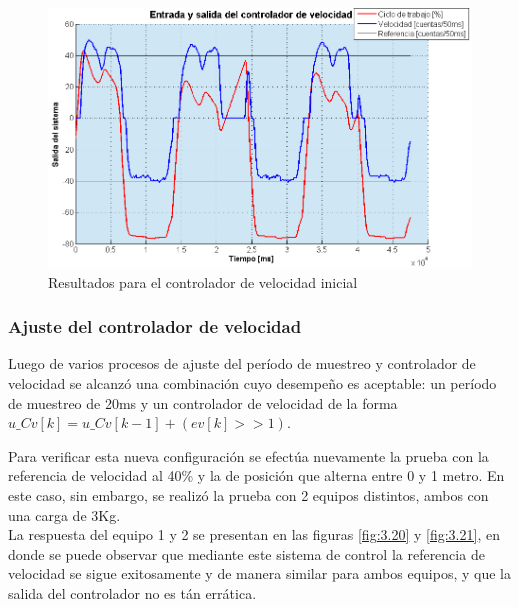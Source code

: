 \begin{figure}[!ht]
	\centering
	\includegraphics[width=16cm,scale=1]{resources/3_19-esquemaControl1.png}
	\caption{Resultados para el controlador de velocidad inicial}
	\label{fig:\thefigure}
\end{figure}

\subsubsection{Ajuste del controlador de velocidad}
Luego de varios procesos de ajuste del período de muestreo y controlador de velocidad se alcanzó una combinación cuyo desempeño es aceptable: un período de muestreo de 20ms y un controlador de velocidad de la forma \(u\_Cv[k] = u\_Cv[k-1] + (ev[k] >> 1)\).

Para verificar esta nueva configuración se efectúa nuevamente la prueba con la referencia de velocidad al 40\% y la de posición que alterna entre 0 y 1 metro. En este caso, sin embargo, se realizó la prueba con 2 equipos distintos, ambos con una carga de 3Kg.\\
La respuesta del equipo 1 y 2 se presentan en las figuras \ref{fig:3.20} y \ref{fig:3.21}, en donde se puede observar que mediante este sistema de control la referencia de velocidad se sigue exitosamente y de manera similar para ambos equipos, y que la salida del controlador no es tán errática.

